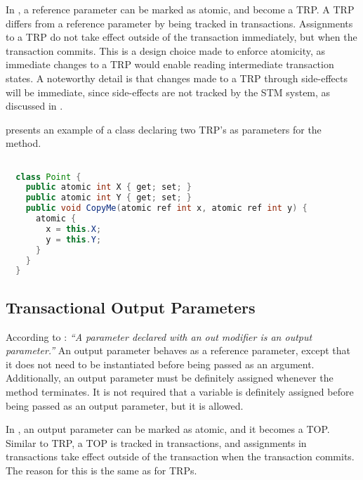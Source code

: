 In \stmname, a reference parameter can be marked as atomic, and become a \ac{TRP}. A \ac{TRP} differs from a reference parameter by being tracked in transactions. Assignments to a \ac{TRP} do not take effect outside of the transaction immediately, but when the transaction commits. This is a design choice made to enforce atomicity, as immediate changes to a \ac{TRP} would enable reading intermediate transaction states. A noteworthy detail is that changes made to a \ac{TRP} through side-effects will be immediate, since side-effects are not tracked by the \ac{STM} system, as discussed in .

 presents an example of a  class declaring two \ac{TRP}'s as parameters for the  method.

\begin{lstlisting}[label=lst:atomic_ref,
 caption={Transactional Reference Parameter},
 language=Java, 
 showspaces=false,
 showtabs=false,
 breaklines=true,
 showstringspaces=false,
 breakatwhitespace=true,
 commentstyle=\color{greencomments},
 keywordstyle=\color{bluekeywords},
 stringstyle=\color{redstrings},
 morekeywords={atomic, retry, orElse, var, get, set, ref, out}]  % Start your code-block

  class Point {
    public atomic int X { get; set; }
    public atomic int Y { get; set; }
    public void CopyMe(atomic ref int x, atomic ref int y) {
      atomic {
        x = this.X;
        y = this.Y;
      }
    }   
  }
\end{lstlisting}

\subsection{Transactional Output Parameters}
\label{subsec:stm_desgin_out_parameters}
According to \cite[p. 97]{csharp2013specificaiton}: \textit{``A parameter declared with an out modifier is an output parameter.''} An output parameter behaves as a reference parameter, except that it does not need to be instantiated before being passed as an argument. Additionally, an output parameter must be definitely assigned whenever the method terminates\cite[p. 42]{sestoft2011c}. It is not required that a variable is definitely assigned before being passed as an output parameter, but it is allowed.

In \stmname, an output parameter can be marked as atomic, and it becomes a \ac{TOP}. Similar to \ac{TRP}, a \ac{TOP} is tracked in transactions, and assignments in transactions take effect outside of the transaction when the transaction commits. The reason for this is the same as for \acp{TRP}.

